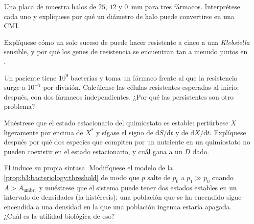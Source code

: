 \begin{exercise}[$\star\star$]\label{exo:b3:bacteriology:7}
Una placa de  muestra halos de $25$, $12$ y
\qty{0}{mm} para tres fármacos. Interprétese cada uno y explíquese por
qué un diámetro de halo puede convertirse en una CMI.
\end{exercise}

\begin{exercise}[$\star\star$]\label{exo:b3:bacteriology:8}
Explíquese cómo un solo suceso de  puede hacer resistente a
cinco  a una \emph{Klebsiella} sensible, y por qué los genes
de resistencia se encuentran tan a menudo juntos en .
\end{exercise}

\begin{exercise}[$\star\star$]\label{exo:b3:bacteriology:9}
Un paciente tiene $10^{9}$ bacterias y toma un fármaco frente al que la
resistencia surge a $10^{-7}$ por división. Calcúlense las células
resistentes esperadas al inicio; después, con dos fármacos
independientes. ¿Por qué las persistentes son otro problema?
\end{exercise}

\begin{exercise}[$\star\star\star$]\label{exo:b3:bacteriology:10}
Muéstrese que el estado estacionario del quimiostato es estable:
pertúrbese $X$ ligeramente por encima de $X^{*}$ y sígase el signo de
$\mathrm{d}S/\mathrm{d}t$ y de $\mathrm{d}X/\mathrm{d}t$. Explíquese
después por qué dos especies que compiten por un nutriente en un
quimiostato no pueden coexistir en el estado estacionario, y cuál gana a
un $D$ dado.
\end{exercise}

\begin{exercise}[$\star\star\star$]\label{exo:b3:bacteriology:11}
El  induce su propia sintasa. Modifíquese el modelo de la
\cref{prop:b3:bacteriology:threshold} de modo que $p$ salte de $p_{0}$ a
$p_{1} \gg p_{0}$ cuando $A > A_{\text{umbr}}$, y muéstrese que el sistema
puede tener dos estados estables en un intervalo de densidades (la
histéresis): una población que se ha encendido sigue encendida a una
densidad en la que una población ingenua estaría apagada. ¿Cuál es la
utilidad biológica de eso?
\end{exercise}

